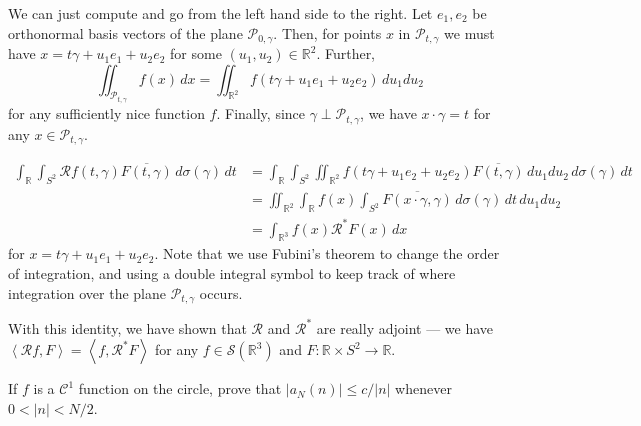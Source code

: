 \documentclass[12 pt, letterpaper]{hmcpset}
\begin{document}
\begin{solution}
	We can just compute and go from the left hand side to the right. Let $e_{1}, e_{2}$ be orthonormal basis vectors of the plane $\mathcal{P}_{0, \gamma}$. Then, for points $x$ in $\mathcal{P}_{t, \gamma}$ we must have $x = t \gamma + u_{1} e_{1} + u_{2} e_{2}$ for some $(u_{1}, u_{2}) \in \mathbb{R}^{2}$. Further,
	\[
		\iint_{\mathcal{P}_{t, \gamma}} f(x) \, dx = \iint_{\mathbb{R}^{2}} f(t \gamma + u_{1} e_{1} + u_{2} e_{2}) \, du_{1} du_{2}
	\]
	for any sufficiently nice function $f$. Finally, since $\gamma \perp \mathcal{P}_{t, \gamma}$, we have $x \cdot \gamma = t$ for any $x \in \mathcal{P}_{t, \gamma}$.

	\begin{align*}
		\int_{\mathbb{R}} \int_{S^{2}} \mathcal{R} f(t, \gamma) \overline{F(t, \gamma)} \, d\sigma(\gamma)  \, dt & = \int_{\mathbb{R}} \int_{S^{2}} \iint_{\mathbb{R}^{2}} f(t \gamma + u_{1} e_{2} + u_{2} e_{2}) \overline{F(t, \gamma)} \, du_{1} du_{2}  \, d\sigma(\gamma)  \, dt \\
															  & = \iint_{\mathbb{R}^{2}} \int_{\mathbb{R}} f(x) \int_{S^{2}}  \overline{F(x \cdot \gamma, \gamma)} \, d\sigma(\gamma)  \, dt  \, du_{1} du_{2} \\
															  & = \int_{\mathbb{R}^{3}} f(x) \mathcal{R}^{*} F(x) \, dx
	\end{align*}
	for $x = t \gamma + u_{1} e_{1} + u_{2} e_{2}$. Note that we use Fubini's theorem to change the order of integration, and using a double integral symbol to keep track of where integration over the plane $\mathcal{P}_{t, \gamma}$ occurs.

	With this identity, we have shown that $\mathcal{R}$ and $\mathcal{R}^{*}$ are really adjoint --- we have $\left < \mathcal{R} f, F \right > = \left < f, \mathcal{R}^{*} F \right >$ for any $f \in \mathcal{S}(\mathbb{R}^{3})$ and $F : \mathbb{R} \times S^{2} \to \mathbb{R}$.
\end{solution}

\pagebreak

\begin{problem}[S \& S \S 7.3 \#2]
	If $f$ is a $\mathcal{C}^{1}$ function on the circle, prove that $\lvert a_{N}(n) \rvert \le c / \lvert n \rvert$ whenever $0 < \lvert n \rvert < N / 2$.
\end{problem}
\end{document}
